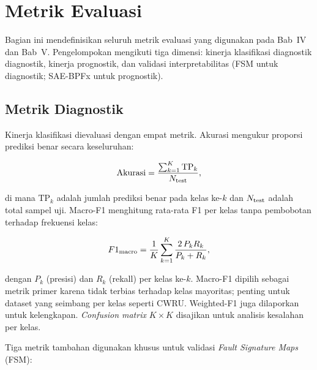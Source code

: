\section{Metrik Evaluasi}
\label{sec:bab3_metrik_bersama}

Bagian ini mendefinisikan seluruh metrik evaluasi yang digunakan pada Bab~IV
dan Bab~V. Pengelompokan mengikuti tiga dimensi: kinerja klasifikasi diagnostik
{\color{blue}diagnostik}, kinerja prognostik, dan validasi interpretabilitas
(FSM untuk {\color{blue}diagnostik}; SAE-BPFx untuk {\color{blue}prognostik}).

\subsection{Metrik Diagnostik}
\label{subsec:bab3_metrik_diagnostik}

Kinerja klasifikasi dievaluasi dengan empat metrik. Akurasi mengukur proporsi
prediksi benar secara keseluruhan:

\begin{equation}\label{eq:bab3_akurasi}
  \text{Akurasi} = \frac{\sum_{k=1}^{K} \text{TP}_k}{N_{\rm test}},
\end{equation}

\noindent di mana $\text{TP}_k$ adalah jumlah prediksi benar pada kelas ke-$k$
dan $N_{\rm test}$ adalah total sampel uji. Macro-F1 menghitung rata-rata F1
per kelas tanpa pembobotan terhadap frekuensi kelas:

\begin{equation}\label{eq:bab3_macrof1}
  F1_{\rm macro} = \frac{1}{K} \sum_{k=1}^{K}
    \frac{2\, P_k R_k}{P_k + R_k},
\end{equation}

\noindent dengan $P_k$ (presisi) dan $R_k$ (rekall) per kelas ke-$k$.
Macro-F1 dipilih sebagai metrik primer karena tidak terbias terhadap kelas
mayoritas; penting untuk dataset yang seimbang per kelas seperti CWRU.
Weighted-F1 juga dilaporkan untuk kelengkapan. \emph{Confusion matrix}
$K \times K$ disajikan untuk analisis kesalahan per kelas.

Tiga metrik tambahan digunakan khusus untuk validasi \emph{Fault Signature
Maps} (FSM):

